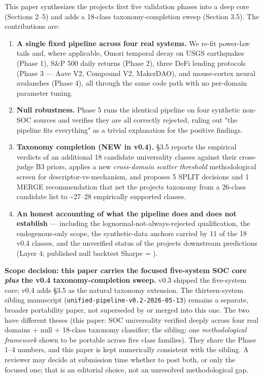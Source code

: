 \documentclass[
  11pt]{article}
\providecommand{\tightlist}{%
  \setlength{\itemsep}{0pt}\setlength{\parskip}{0pt}}
\begin{document}
This paper synthesizes the project\textquotesingle s first five
validation phases into a deep core (Sections 2--5) and adds a 18-class
taxonomy-completion sweep (Section 3.5). The contributions are:

\begin{enumerate}
\def\labelenumi{\arabic{enumi}.}
\tightlist
\item
  \textbf{A single fixed pipeline across four real systems.} We re-fit
  power-law tails and, where applicable, Omori temporal decay on USGS
  earthquakes (Phase 1), S\&P 500 daily returns (Phase 2), three DeFi
  lending protocols (Phase 3 --- Aave V2, Compound V2, MakerDAO), and
  mouse-cortex neural avalanches (Phase 4), all through the same code
  path with no per-domain parameter tuning.
\item
  \textbf{Null robustness.} Phase 5 runs the identical pipeline on four
  synthetic non-SOC sources and verifies they are all correctly
  rejected, ruling out "the pipeline fits everything" as a trivial
  explanation for the positive findings.
\item
  \textbf{Taxonomy completion (NEW in v0.4).} §3.5 reports the empirical
  verdicts of an additional 18 candidate universality classes against
  their cross-judge B3 priors, applies a new \emph{cross-domain scatter
  threshold} methodological screen for descriptor-vs-mechanism, and
  proposes 5 SPLIT decisions and 1 MERGE recommendation that net the
  project\textquotesingle s taxonomy from a 26-class candidate list to
  \textasciitilde 27--28 empirically supported classes.
\item
  \textbf{An honest accounting of what the pipeline does and does not
  establish} --- including the lognormal-not-always-rejected
  qualification, the endogenous-only scope, the synthetic-data anchors
  carried by 11 of the 18 v0.4 classes, and the unverified status of the
  project\textquotesingle s downstream predictions (Layer 4; published
  null backtest Sharpe = ).
\end{enumerate}

\textbf{Scope decision: this paper carries the focused five-system SOC
core \emph{plus} the v0.4 taxonomy-completion sweep.} v0.3 shipped the
five-system core; v0.4 adds §3.5 as the natural taxonomy extension. The
thirteen-system sibling manuscript
(\texttt{unified-pipeline-v0.2-2026-05-13}) remains a separate, broader
portability paper, not superseded by or merged into this one. The two
have different theses (this paper: SOC universality verified deeply
across four real domains + null + 18-class taxonomy classifier; the
sibling: one \emph{methodological framework} shown to be portable across
five class families). They share the Phase 1--4 numbers, and this paper
is kept numerically consistent with the sibling. A reviewer may decide
at submission time whether to post both, or only the focused one; that
is an editorial choice, not an unresolved methodological gap.
\end{document}
